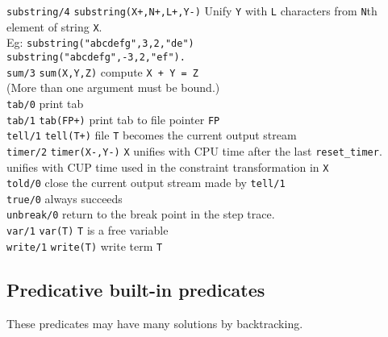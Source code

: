 \begin{tabbing}
{\tt substring/4}\> {\tt substring(X+,N+,L+,Y-)} 
	Unify {\tt Y} with {\tt L} characters from {\tt N}th element
of string {\tt X}.\\
	\> Eg: {\tt substring("abcdefg",3,2,"de")}\\
	\> \hspace{19pt} {\tt substring("abcdefg",-3,2,"ef").}\\
{\tt sum/3} \> {\tt sum(X,Y,Z)} compute \verb$X + Y = Z$\\
	\> (More than one argument must be bound.) \\
{\tt tab/0}	\> print tab\\
{\tt tab/1}	\> {\tt tab(FP+)} print tab to file pointer {\tt FP}\\
{\tt tell/1}	\> {\tt tell(T+)} file {\tt T} becomes the current output
stream\\
{\tt timer/2} \> {\tt timer(X-,Y-)} 
	{\tt X} unifies with CPU time after the last {\tt reset\_timer}.\\
	 unifies with CUP time used in the constraint
	transformation in {\tt X}\\
{\tt told/0}	\> close the current output stream made by {\tt tell/1}\\
{\tt true/0}	\> always succeeds\\
{\tt unbreak/0} \> return to the break point in the step trace.\\
{\tt var/1}	\> {\tt var(T)} {\tt T} is a free variable\\
{\tt write/1} \> {\tt write(T)} write term {\tt T}
\end{tabbing}

\subsection{Predicative built-in predicates}
These predicates may have many solutions by backtracking.

